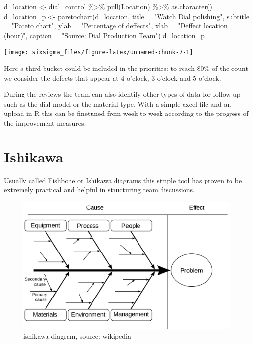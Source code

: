 \documentclass[
]{book}
\newenvironment{Shaded}{\begin{snugshade}}{\end{snugshade}}
\newcommand{\AttributeTok}[1]{\textcolor[rgb]{0.77,0.63,0.00}{#1}}
\newcommand{\FunctionTok}[1]{\textcolor[rgb]{0.00,0.00,0.00}{#1}}
\newcommand{\NormalTok}[1]{#1}
\newcommand{\OtherTok}[1]{\textcolor[rgb]{0.56,0.35,0.01}{#1}}
\newcommand{\SpecialCharTok}[1]{\textcolor[rgb]{0.00,0.00,0.00}{#1}}
\newcommand{\StringTok}[1]{\textcolor[rgb]{0.31,0.60,0.02}{#1}}
\begin{document}
\begin{Shaded}
\begin{Highlighting}[]
\NormalTok{d\_location }\OtherTok{\textless{}{-}}\NormalTok{ dial\_control }\SpecialCharTok{\%\textgreater{}\%} \FunctionTok{pull}\NormalTok{(Location) }\SpecialCharTok{\%\textgreater{}\%} \FunctionTok{as.character}\NormalTok{()}
\NormalTok{d\_location\_p }\OtherTok{\textless{}{-}} \FunctionTok{paretochart}\NormalTok{(d\_location, }
                           \AttributeTok{title =} \StringTok{"Watch Dial polishing"}\NormalTok{,}
                           \AttributeTok{subtitle =} \StringTok{"Pareto chart"}\NormalTok{, }
                           \AttributeTok{ylab =} \StringTok{"Percentage of deffects"}\NormalTok{,}
                           \AttributeTok{xlab =} \StringTok{"Deffect location (hour)"}\NormalTok{,}
                           \AttributeTok{caption =} \StringTok{"Source: Dial Production Team"}\NormalTok{)}
\NormalTok{d\_location\_p}
\end{Highlighting}
\end{Shaded}

\texttt{[image: sixsigma\_files/figure-latex/unnamed-chunk-7-1]}

Here a third bucket could be included in the priorities: to reach 80\% of the count we consider the defects that appear at 4 o'clock, 3 o'clock and 5 o'clock.

During the reviews the team can also identify other types of data for follow up such as the dial model or the material type. With a simple excel file and an upload in R this can be finetuned from week to week according to the progress of the improvement measures.

\hypertarget{ishikawa}{%
\section{Ishikawa}\label{ishikawa}}

Usually called Fishbone or Ishikawa diagrams this simple tool has proven to be extremely practical and helpful in structuring team discussions.

\begin{figure}

{\centering \includegraphics[width=0.6\linewidth]{img/ishikawa} 

}

\caption{ishikawa diagram, source: wikipedia}\label{fig:fig-ishikawa}
\end{figure}
\end{document}
